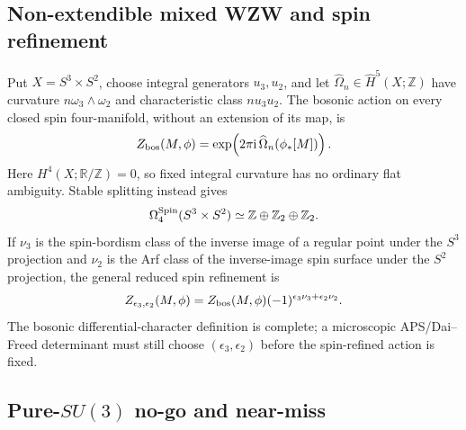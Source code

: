 \documentclass[11pt]{article}
\numberwithin{equation}{section}
\newcommand{\RR}{\mathbb R}
\newcommand{\ZZ}{\mathbb Z}
\newcommand{\ii}{\mathrm i}
\begin{document}
\subsection{Non-extendible mixed WZW and spin refinement}

Put \(X=S^3\times S^2\), choose integral generators \(u_3,u_2\), and let
\(\widehat\Omega_n\in\widehat H^5(X;\ZZ)\) have curvature
\(n\omega_3\wedge\omega_2\) and characteristic class \(n u_3u_2\).  The
bosonic action on every closed spin four-manifold, without an extension of
its map, is
\begin{equation}
 Z_{\rm bos}(M,\phi)=
 \exp\!\left(2\pi\ii\,\widehat\Omega_n(\phi_*[M])\right).
 \label{eq:handoff-diff-character}
\end{equation}
Here \(H^4(X;\RR/\ZZ)=0\), so fixed integral curvature has no ordinary flat
ambiguity.  Stable splitting instead gives
\begin{equation}
 \Omega_4^{\rm Spin}(S^3\times S^2)
 \simeq\ZZ\oplus\ZZ_2\oplus\ZZ_2.
 \label{eq:handoff-spin-bordism}
\end{equation}
If \(\nu_3\) is the spin-bordism class of the inverse image of a regular
point under the \(S^3\) projection and \(\nu_2\) is the Arf class of the
inverse-image spin surface under the \(S^2\) projection, the general reduced
spin refinement is
\begin{equation}
 Z_{\epsilon_3,\epsilon_2}(M,\phi)=Z_{\rm bos}(M,\phi)
 (-1)^{\epsilon_3\nu_3+\epsilon_2\nu_2}.
 \label{eq:handoff-spin-refinement}
\end{equation}
The bosonic differential-character definition is complete; a microscopic
APS/Dai--Freed determinant must still choose
\((\epsilon_3,\epsilon_2)\) before the spin-refined action is fixed.

\subsection{Pure-\texorpdfstring{\(SU(3)\)}{SU(3)} no-go and near-miss}
\end{document}
